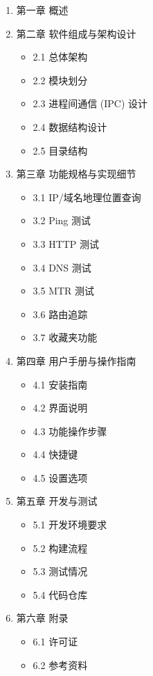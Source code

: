 \documentclass{article}
\begin{document}
\begin{enumerate}[label=\arabic*.]
    \item 第一章 概述
    \item 第二章 软件组成与架构设计
    \begin{itemize}
        \item 2.1 总体架构
        \item 2.2 模块划分
        \item 2.3 进程间通信 (IPC) 设计
        \item 2.4 数据结构设计
        \item 2.5 目录结构
    \end{itemize}
    \item 第三章 功能规格与实现细节
    \begin{itemize}
        \item 3.1 IP/域名地理位置查询
        \item 3.2 Ping 测试
        \item 3.3 HTTP 测试
        \item 3.4 DNS 测试
        \item 3.5 MTR 测试
        \item 3.6 路由追踪
        \item 3.7 收藏夹功能
    \end{itemize}
    \item 第四章 用户手册与操作指南
    \begin{itemize}
        \item 4.1 安装指南
        \item 4.2 界面说明
        \item 4.3 功能操作步骤
        \item 4.4 快捷键
        \item 4.5 设置选项
    \end{itemize}
    \item 第五章 开发与测试
    \begin{itemize}
        \item 5.1 开发环境要求
        \item 5.2 构建流程
        \item 5.3 测试情况
        \item 5.4 代码仓库
    \end{itemize}
    \item 第六章 附录
    \begin{itemize}
        \item 6.1 许可证
        \item 6.2 参考资料
    \end{itemize}
\end{enumerate}
\end{document}
